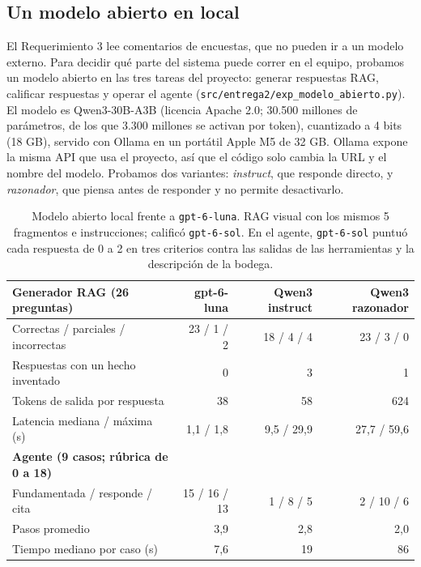\documentclass[11pt,letterpaper]{article}
\newcommand{\cod}[1]{\texttt{\small #1}}
\begin{document}
\subsection{Un modelo abierto en local}
\label{sec:abierto}

El Requerimiento 3 lee comentarios de encuestas, que no pueden ir a un modelo externo. Para decidir qué parte del sistema puede correr en el equipo, probamos un modelo abierto en las tres tareas del proyecto: generar respuestas RAG, calificar respuestas y operar el agente (\cod{src/entrega2/exp\_modelo\_abierto.py}). El modelo es Qwen3-30B-A3B (licencia Apache 2.0; 30.500 millones de parámetros, de los que 3.300 millones se activan por token), cuantizado a 4 bits (18 GB), servido con Ollama en un portátil Apple M5 de 32 GB. Ollama expone la misma API que usa el proyecto, así que el código solo cambia la URL y el nombre del modelo. Probamos dos variantes: \emph{instruct}, que responde directo, y \emph{razonador}, que piensa antes de responder y no permite desactivarlo.

\begin{table}[H]\small\renewcommand{\arraystretch}{1.12}\centering
\begin{tabular}{lrrr}
\toprule
\textbf{Generador RAG (26 preguntas)} & \textbf{gpt-6-luna} & \textbf{Qwen3 instruct} & \textbf{Qwen3 razonador} \\
\midrule
Correctas / parciales / incorrectas & 23 / 1 / 2 & 18 / 4 / 4 & 23 / 3 / 0 \\
Respuestas con un hecho inventado & 0 & 3 & 1 \\
Tokens de salida por respuesta & 38 & 58 & 624 \\
Latencia mediana / máxima (s) & 1,1 / 1,8 & 9,5 / 29,9 & 27,7 / 59,6 \\
\midrule
\textbf{Agente (9 casos; rúbrica de 0 a 18)} & & & \\
\midrule
Fundamentada / responde / cita & 15 / 16 / 13 & 1 / 8 / 5 & 2 / 10 / 6 \\
Pasos promedio & 3,9 & 2,8 & 2,0 \\
Tiempo mediano por caso (s) & 7,6 & 19 & 86 \\
\bottomrule
\end{tabular}
\caption{Modelo abierto local frente a \cod{gpt-6-luna}. RAG visual con los mismos 5 fragmentos e instrucciones; calificó \cod{gpt-6-sol}. En el agente, \cod{gpt-6-sol} puntuó cada respuesta de 0 a 2 en tres criterios contra las salidas de las herramientas y la descripción de la bodega.}
\label{tab:abierto}
\end{table}
\end{document}
